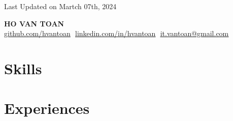 \documentclass[letterpaper,11pt]{article}
\begin{document}


\begin{flushright}
	\vspace{-4pt}
	\color{gray}
	\item
	Last Updated on Martch 07th, 2024
\end{flushright}

\vspace{-5pt}

\begin{center}
	\textbf{\Huge\scshape{HO VAN TOAN}}\vspace{8pt} \\
	\small
	\href{https://github.com/hvantoan}{\underline{github.com/hvantoan}} $  $
	\href{https://linkedin.com/in/hvantoan}{\underline{linkedin.com/in/hvantoan}} $  $
	\href{mailto:it.vantoan@gmail.com}
	{\underline{it.vantoan@gmail.com}}
\end{center}

\section{Skills}

\section{Experiences}
\end{document}
